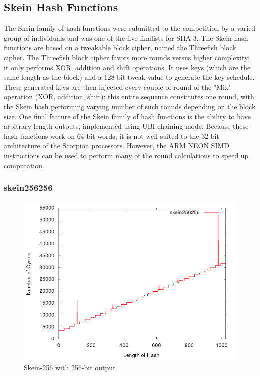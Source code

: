 \documentclass[10pt,a4paper]{article}
\begin{document}
\subsection{Skein Hash Functions}
The Skein family of hash functions were submitted to the competition by a varied group of individuals and was one of the five finalists for SHA-3.  The Skein hash functions are based on a tweakable block cipher, named the Threefish block cipher.  The Threefish block cipher favors more rounds versus higher complexity; it only performs XOR, addition and shift operations.  It uses keys (which are the same length as the block) and a 128-bit tweak value to generate the key schedule.  These generated keys are then injected every couple of round of the "Mix" operation (XOR, addition, shift); this entire sequence constitutes one round, with the Skein hash performing varying number of such rounds depending on the block size.  One final feature of the Skein family of hash functions is the ability to have arbitrary length outputs, implemented using UBI chaining mode.  Because these hash functions work on 64-bit words, it is not well-suited to the 32-bit architecture of the Scorpion processors.  However, the ARM NEON SIMD instructions can be used to perform many of the round calculations to speed up computation.

\subsubsection{skein256256}

    \begin{figure}[H]
        \begin{center}
            \includegraphics[scale=0.5]{images/skein256256.png} 
            \caption{Skein-256 with 256-bit output}
        \end{center}
    \end{figure}
\end{document}

